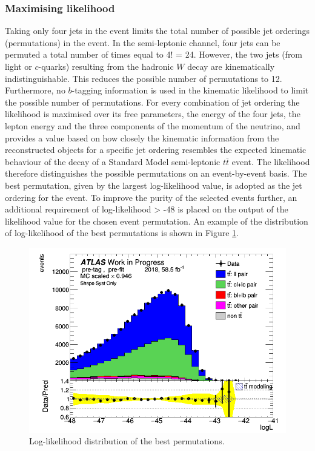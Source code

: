 \documentclass[letterpaper,12pt]{article}
\begin{document}
\subsubsection{Maximising likelihood}
Taking only four jets in the event limits the total number of possible jet orderings (permutations) in the event. In the semi-leptonic channel, four jets can be permuted a total number of times equal to 4! = 24. However, the two jets (from light or $c$-quarks) resulting from the hadronic $W$ decay are kinematically indistinguishable. This reduces the possible number of permutations to 12. Furthermore, no $b$-tagging information is used in the kinematic likelihood to limit the possible number of permutations.
For every combination of jet ordering the likelihood is maximised over its free parameters, the energy of the four jets, the lepton energy and the three components of the momentum of the neutrino, and provides a value based on how closely the kinematic information from the reconstructed objects for a specific jet ordering resembles the expected kinematic behaviour of the decay of a Standard Model semi-leptonic $t\bar{t}$ event. The likelihood therefore distinguishes the possible permutations on an event-by-event basis. The best permutation, given by the largest log-likelihood value, is adopted as the jet ordering for the event\cite{cjet}. To improve the purity of the selected events further, an additional requirement of log-likelihood > -48  is placed on the output of the likelihood value for the chosen event permutation. An example of the distribution of log-likelihood of the best permutations is shown in Figure \ref{fig:loglikelihood}.

\begin{figure}[H]
\centering
\begin{minipage}[b]{.45\textwidth}
\centering
\includegraphics[width=1\textwidth]{Distribution_March/DataMC_LLR.png}
\end{minipage}
\caption{Log-likelihood distribution of the best permutations.}
\label{fig:loglikelihood}
\end{figure}
\end{document}

